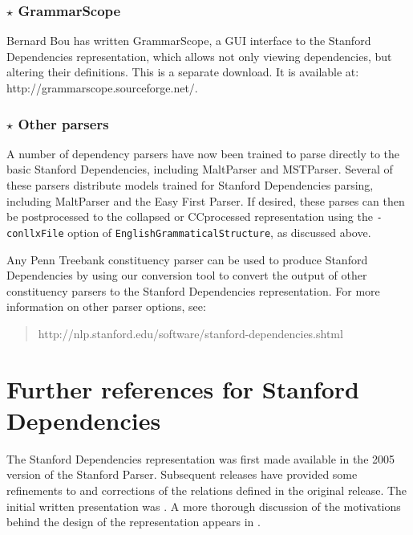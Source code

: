 \documentclass[11pt,letter]{article}
\def\url#1{\textsf{#1}}
\begin{document}
\subsubsection*{$\star$ \textbf{GrammarScope}}
Bernard Bou has written \textsf{GrammarScope}, a GUI interface to the Stanford
Dependencies representation, which allows not only viewing
dependencies, but altering their definitions.  This is a separate download.  It is available at:
\url{http://grammarscope.sourceforge.net/}.

\subsubsection*{$\star$ \textbf{Other parsers}}

A number of dependency parsers have now been trained to parse directly
to the basic Stanford Dependencies, including MaltParser and
MSTParser.  Several of these parsers distribute models trained for
Stanford Dependencies parsing, including MaltParser and the Easy First
Parser.  If desired, these parses can then be postprocessed to the collapsed or CCprocessed representation using the \texttt{-conllxFile} option of \texttt{EnglishGrammaticalStructure}, as discussed above.

Any Penn Treebank constituency parser can be used to produce Stanford
Dependencies by using our conversion tool to convert the output of other constituency parsers to the Stanford Dependencies representation.  For more information on other parser options, see:
\begin{quote}
\url{http://nlp.stanford.edu/software/stanford-dependencies.shtml}
\end{quote}

\section{Further references for Stanford Dependencies}\label{refs}

The Stanford Dependencies representation was first made available in
the 2005 version of the Stanford Parser.  Subsequent releases have
provided some refinements to and corrections of the relations defined
in the original release.  The initial written presentation was
\citep{demarneffe06generating}.  A more thorough discussion of the
motivations behind the design of the representation appears in
\citep{demarneffe08stanford}.
\end{document}
